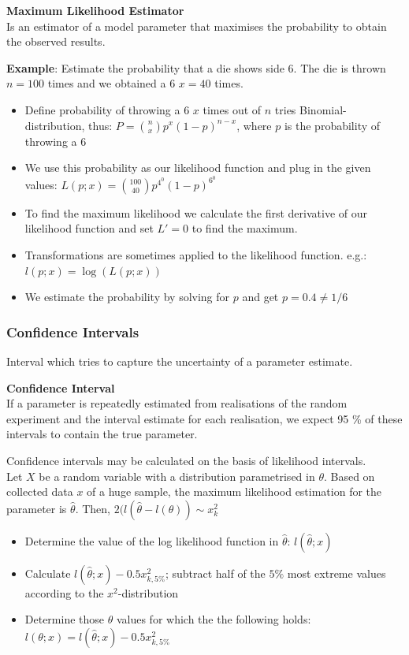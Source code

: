 \documentclass{article}
\begin{document}
\begin{multicols*}{3}
\begin{mdframed}[backgroundcolor=astral] 
    \textbf{Maximum Likelihood Estimator}\\
    Is an estimator of a model parameter that maximises the probability to obtain the observed results.
\end{mdframed}

\textbf{Example}: Estimate the probability that a die shows side 6. \textrightarrow The die is thrown $n = 100$ times and we obtained a 6 $x = 40$ times. 
\begin{itemize}
    \item Define probability of throwing a 6 $x$ times out of $n$ tries \textrightarrow Binomial-distribution, thus: $P = {n\choose x}p^x(1-p)^{n-x}$, where $p$ is the probability of throwing a 6
    \item We use this probability as our likelihood function and plug in the given values: $L(p;x) = {100\choose 40}p^4^0(1-p)^6^0$
    \item To find the maximum likelihood we calculate the first derivative of our likelihood function and set $L' = 0$ to find the maximum. 
    \item Transformations are sometimes applied to the likelihood function. e.g.: $l(p;x) = \log (L(p;x))$
    \item We estimate the probability by solving for $p$ and get $p = 0.4 \neq 1/6$
\end{itemize}

\subsubsection{Confidence Intervals}

Interval which tries to capture the uncertainty of a parameter estimate. 

\begin{mdframed}[backgroundcolor=astral] 
    \textbf{Confidence Interval}\\
    If a parameter is repeatedly estimated from realisations of the random experiment and the interval estimate for each realisation, we expect 95 \% of these intervals to contain the true parameter.
\end{mdframed}

Confidence intervals may be calculated on the basis of likelihood intervals.\\
Let $X$ be a random variable with a distribution parametrised in $\theta$. Based on collected data $x$ of a huge sample, the maximum likelihood estimation for the parameter is $\hat{\theta}$. Then, $2(l(\hat{\theta} - l(\theta)) \sim x^2_k$
\begin{itemize}
    \item Determine the value of the log likelihood function in $\hat{\theta}$: $l(\hat{\theta};x)$
    \item Calculate $l(\hat{\theta};x) - 0.5x^2_{k,5\%}$; subtract half of the $5\%$ most extreme values according to the $x^2$-distribution
    \item Determine those $\theta$ values for which the the following holds: 
    $l(\theta;x) = l(\hat{\theta};x) - 0.5x^2_{k,5\%}$
\end{itemize}


\end{multicols*}
\end{document}
